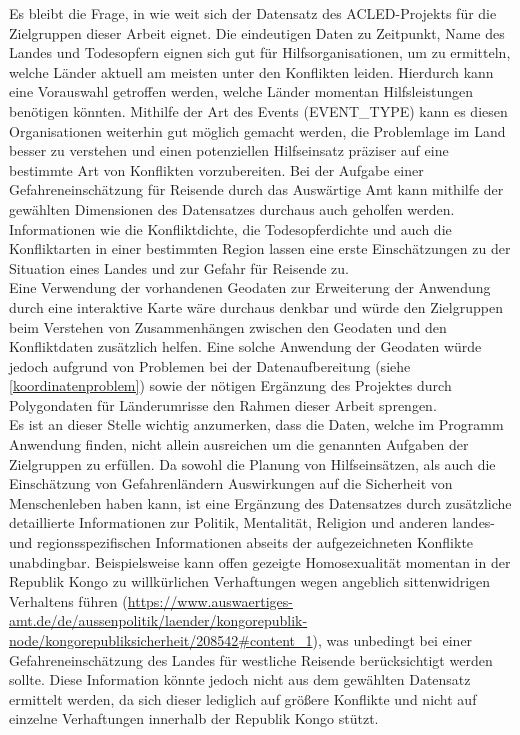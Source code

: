 \documentclass[usegeometry=true]{scrartcl}
\begin{document}
Es bleibt die Frage, in wie weit sich der Datensatz des ACLED-Projekts für die Zielgruppen dieser Arbeit eignet. Die eindeutigen Daten zu Zeitpunkt, Name des Landes und Todesopfern eignen sich gut für Hilfsorganisationen, um zu ermitteln, welche Länder aktuell am meisten unter den Konflikten leiden. Hierdurch kann eine Vorauswahl getroffen werden, welche Länder momentan Hilfsleistungen benötigen könnten. Mithilfe der Art des Events (EVENT\_TYPE) kann es diesen Organisationen weiterhin gut möglich gemacht werden, die Problemlage im Land besser zu verstehen und einen potenziellen Hilfseinsatz präziser auf eine bestimmte Art von Konflikten vorzubereiten. Bei der Aufgabe einer Gefahreneinschätzung für Reisende durch das Auswärtige Amt kann mithilfe der gewählten Dimensionen des Datensatzes durchaus auch geholfen werden. Informationen wie die Konfliktdichte, die Todesopferdichte und auch die Konfliktarten in einer bestimmten Region lassen eine erste Einschätzungen zu der Situation eines Landes und zur Gefahr für Reisende zu.\\ Eine Verwendung der vorhandenen Geodaten zur Erweiterung der Anwendung durch eine interaktive Karte wäre durchaus denkbar und würde den Zielgruppen beim Verstehen von Zusammenhängen zwischen den Geodaten und den Konfliktdaten zusätzlich helfen. Eine solche Anwendung der Geodaten würde jedoch aufgrund von Problemen bei der Datenaufbereitung (siehe \ref{koordinatenproblem}) sowie der nötigen Ergänzung des Projektes durch Polygondaten für Länderumrisse den Rahmen dieser Arbeit sprengen.\\ Es ist an dieser Stelle wichtig anzumerken, dass die Daten, welche im Programm Anwendung finden, nicht allein ausreichen um die genannten Aufgaben der Zielgruppen zu erfüllen. Da sowohl die Planung von Hilfseinsätzen, als auch die Einschätzung von Gefahrenländern Auswirkungen auf die Sicherheit von Menschenleben haben kann, ist eine Ergänzung des Datensatzes durch zusätzliche detaillierte Informationen zur Politik, Mentalität, Religion und anderen landes- und regionsspezifischen Informationen abseits der aufgezeichneten Konflikte unabdingbar. Beispielsweise kann offen gezeigte Homosexualität momentan in der Republik Kongo zu willkürlichen Verhaftungen wegen angeblich sittenwidrigen Verhaltens führen (\url{https://www.auswaertiges-amt.de/de/aussenpolitik/laender/kongorepublik-node/kongorepubliksicherheit/208542#content_1}), was unbedingt bei einer Gefahreneinschätzung des Landes für westliche Reisende berücksichtigt werden sollte. Diese Information könnte jedoch nicht aus dem gewählten Datensatz ermittelt werden, da sich dieser lediglich auf größere Konflikte und nicht auf einzelne Verhaftungen innerhalb der Republik Kongo stützt.
\end{document}
